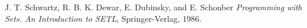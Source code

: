 



%
%
%
%


\begin{thebibliography}{99}

%
J. T. Schwartz, {R. B. K.} Dewar, E. Dubinsky, and E. Schonber
{\em Programming with Sets. An Introduction to SETL},
Springer-Verlag, 1986.

\end{thebibliography}

